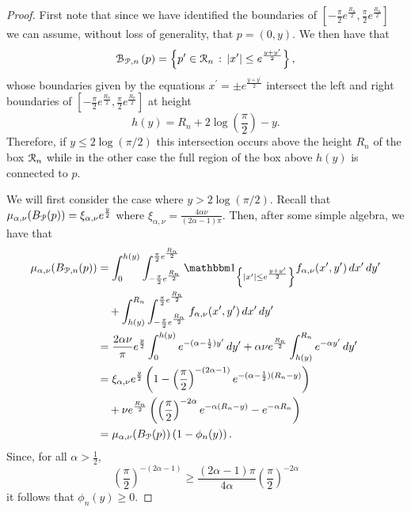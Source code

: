 \begin{proof}
First note that since we have identified the boundaries of $[-\frac{\pi}{2}e^{\frac{R_n}{2}}, \frac{\pi}{2}e^{\frac{R_n}{2}}]$ we can assume, without loss of generality, that $p = (0,y)$. We then have that
\[
	{\mathcal B}_{{\mathcal P},n}\left(p\right) = \left\{p^\prime \in {\mathcal R}_n \, : \, |x^\prime| \le e^{\frac{y + y^\prime}{2}}\right\},
\] 
whose boundaries given by the equations $x^\prime = \pm e^{\frac{y+y^\prime}{2}}$ intersect the left and right boundaries of $[-\frac{\pi}{2}e^{\frac{R_n}{2}}, \frac{\pi}{2}e^{\frac{R_n}{2}}]$ at height
\[
	h(y) = R_n + 2 \log\left(\frac{\pi}{2}\right) - y.
\]
Therefore, if $y \le 2 \log(\pi/2)$ this intersection occurs above the height $R_n$ of the box ${\mathcal R}_n$ while in the other case the full region of the box above $h(y)$ is connected to $p$. 

We will first consider the case where $y > 2 \log(\pi/2)$. Recall that $\mu_{\alpha,\nu}(B_{{\mathcal P}}(p)) = \xi_{\alpha,\nu}e^{\frac{y}{2}}$ where $\xi_{\alpha,\nu} = \frac{4\alpha \nu}{(2\alpha - 1)\pi}$. Then, after some simple algebra, we have that
\begin{align*}
	\mu_{\alpha,\nu}(B_{\Pcal,n}(p))
	&= \int_0^{h(y)} \int_{-\frac{\pi}{2}e^{\frac{R_n}{2}}}^{\frac{\pi}{2}e^{\frac{R_n}{2}}} 
		\ind{|x^\prime| \le e^{\frac{y+y^\prime}{2}}} f_{\alpha,\nu}(x^\prime,y^\prime) \, dx^\prime \, dy^\prime\\
	&\hspace{10pt}+ \int_{h(y)}^{R_n} \int_{-\frac{\pi}{2}e^{\frac{R_n}{2}}}^{\frac{\pi}{2}e^{\frac{R_n}{2}}} 
		f_{\alpha,\nu}(x^\prime,y^\prime) \, dx^\prime \, dy^\prime\\
	&= \frac{2 \alpha \nu}{\pi} e^{\frac{y}{2}} \int_0^{h(y)} e^{-(\alpha - \frac{1}{2})y^\prime} \, dy^\prime
		+ \alpha \nu e^{\frac{R_n}{2}} \int_{h(y)}^{R_n} e^{-\alpha y^\prime} \, dy^\prime \\
	&= \xi_{\alpha,\nu} e^{\frac{y}{2}}\left(1 - \left(\frac{\pi}{2}\right)^{-(2\alpha - 1)} 
		e^{-(\alpha - \frac{1}{2})(R_n - y)}\right)\\
	&\hspace{10pt}+ \nu e^{\frac{R_n}{2}}\left(\left(\frac{\pi}{2}\right)^{-2\alpha} e^{-\alpha(R_n - y)} 
		- e^{-\alpha R_n}\right)\\
	&= \mu_{\alpha,\nu}(B_\Pcal(p))\left(1 - \phi_n(y)\right).
\end{align*}
Since, for all $\alpha > \frac{1}{2}$,
\[
	\left(\frac{\pi}{2}\right)^{-(2\alpha - 1)} \ge \frac{(2\alpha - 1)\pi}{4\alpha} \left(\frac{\pi}{2}\right)^{-2\alpha}
\]
it follows that $\phi_n(y) \ge 0$.


\end{proof}
